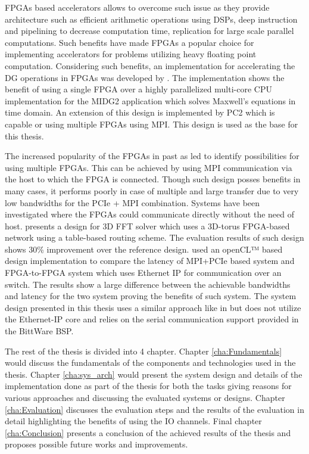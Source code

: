 FPGAs based accelerators allows to overcome such issue as they provide architecture
such as efficient arithmetic operations using DSPs, deep instruction and pipelining
to decrease computation time, replication for large scale parallel computations.
Such benefits have made FPGAs a popular choice for implementing accelerators for
problems utilizing heavy floating point computation. Considering such benefits,
an implementation for accelerating the \ac{DG} operations in FPGAs was
developed by \textcite{kenter_opencl-based_2018}. The implementation shows the benefit
of using a single FPGA over a highly parallelized multi-core CPU implementation for
the MIDG2 application which solves Maxwell’s equations in time domain. An extension
of this design is implemented by PC2 which is capable or using multiple FPGAs using MPI.
This design is used as the base for this thesis.

The increased popularity of the FPGAs in past as led to identify possibilities for
using multiple FPGAs. This can be achieved by using MPI communication via the host
to which the FPGA is connected. Though such design posses benefits in many cases,
it performs poorly in case of multiple and large transfer due to very low bandwidths
for the PCIe + MPI combination. Systems have been investigated where the FPGAs could
communicate directly without the need of host. \textcite{sheng_hpc_2017} presents a design
for 3D FFT solver which uses a 3D-torus FPGA-based network using a table-based routing
scheme. The evaluation results of such design shows 30\% improvement over the reference design.
\textcite{kobayashi_opencl-ready_2018} used an openCL™ based design implementation to
compare the latency of MPI+PCIe based system and FPGA-to-FPGA system which uses Ethernet
IP for communication over an switch. The results show a large difference between the achievable
bandwidths and latency for the two system proving the benefits of such system. The system
design presented in this thesis uses a similar approach like in \cite{kobayashi_opencl-ready_2018}
but does not utilize the Ethernet-IP core and relies on the serial communication
support provided in the BittWare BSP.


The rest of the thesis is divided into 4 chapter. Chapter \ref{cha:Fundamentals} would
discuss the fundamentals of the components and technologies used in the thesis.
Chapter \ref{cha:sys_arch} would present the system design and details of the implementation
done as part of the thesis for both the tasks giving reasons for various approaches and discussing
the evaluated systems or designs. Chapter \ref{cha:Evaluation} discusses the evaluation steps
and the results of the evaluation in detail highlighting the benefits of using the IO channels.
Final chapter \ref{cha:Conclusion} presents a conclusion of the achieved results of the thesis
and proposes possible future works and improvements.